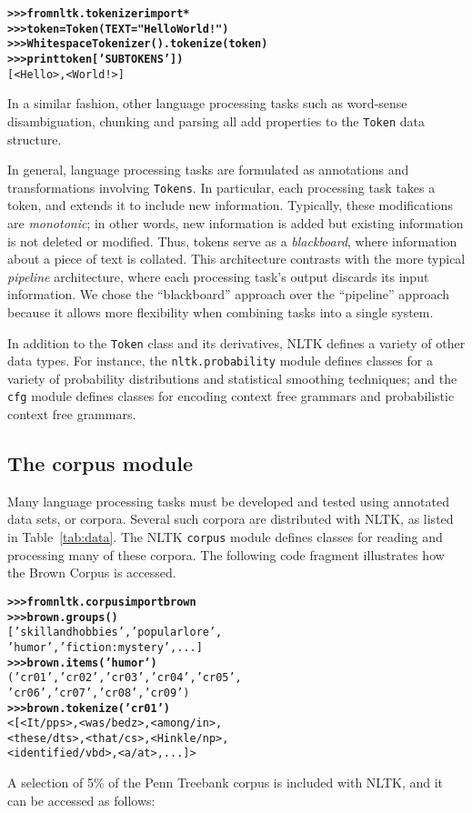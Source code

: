 \documentclass[11pt]{article}
\begin{document}
\begin{alltt}\small
\textbf{>>> from nltk.tokenizer import *}
\textbf{>>> token = Token(TEXT="Hello World!")}
\textbf{>>> WhitespaceTokenizer().tokenize(token)}
\textbf{>>> print token['SUBTOKENS'])}
[<Hello>, <World!>]
\end{alltt}
%
In a similar fashion, other language processing tasks such as
word-sense disambiguation, chunking and parsing all add properties to
the \texttt{Token} data structure.

In general, language processing tasks are formulated as
annotations and transformations involving \texttt{Tokens}.  In
particular, each processing task takes a token, and extends it to
include new information.  Typically, these modifications are
\emph{monotonic}; in other words, new information is added but
existing information is not deleted or modified.  Thus, tokens serve
as a \emph{blackboard}, where information about a piece of text is
collated.  This architecture contrasts with the more typical
\emph{pipeline} architecture, where each processing task's output
discards its input information.  We chose the ``blackboard'' approach
over the ``pipeline'' approach because it allows more flexibility when
combining tasks into a single system.

In addition to the \texttt{Token} class and its derivatives, NLTK
defines a variety of other data types.  For instance, the
\texttt{nltk.probability} module defines classes for a variety of
probability distributions and statistical smoothing techniques; and
the \texttt{cfg} module defines classes for encoding context free
grammars and probabilistic context free grammars.

\subsection{The corpus module}

Many language processing tasks must be developed and tested using
annotated data sets, or corpora.  Several such corpora are distributed
with NLTK, as listed in Table~\ref{tab:data}.  The NLTK
\texttt{corpus} module defines classes for reading and processing
many of these corpora.  The following code fragment illustrates
how the Brown Corpus is accessed.

\begin{alltt}\small
\textbf{>>> from nltk.corpus import brown}
\textbf{>>> brown.groups()}
['skill and hobbies', 'popular lore', 
'humor', 'fiction: mystery', ...]
\textbf{>>> brown.items('humor')}
('cr01', 'cr02', 'cr03', 'cr04', 'cr05',
'cr06', 'cr07', 'cr08', 'cr09')
\textbf{>>> brown.tokenize('cr01')}
<[<It/pps>, <was/bedz>, <among/in>,
<these/dts>, <that/cs>, <Hinkle/np>,
<identified/vbd>, <a/at>, ...]>
\end{alltt}
%
A selection of 5\% of the Penn Treebank corpus is included with
NLTK, and it can be accessed as follows:
\end{document}
